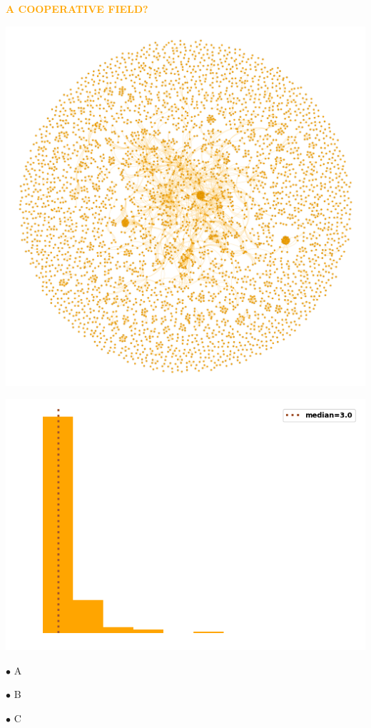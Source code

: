 \documentclass[usenames,dvipsnames,t]{beamer}
\begin{document}
\begin{columns}
\begin{column}{.33\linewidth}
\begin{center}
        \textbf{\Large\textcolor{orange}{\textsc{A COOPERATIVE FIELD?}}}
    \end{center}
    \vspace{1.5cm}

    \begin{center}
        \includegraphics[width=.7\textwidth]{static/pd.png}
    \end{center}

    \begin{center}
        \includegraphics[width=.6\textwidth]{static/degree_dist.png}
        \vspace{1cm}

        \small{
            $\bullet$ A
            \vspace{.2cm}

            $\bullet$ B
            \vspace{.2cm}
            
            $\bullet$ C}
    \end{center}


\end{column}
\end{columns}
\end{document}
